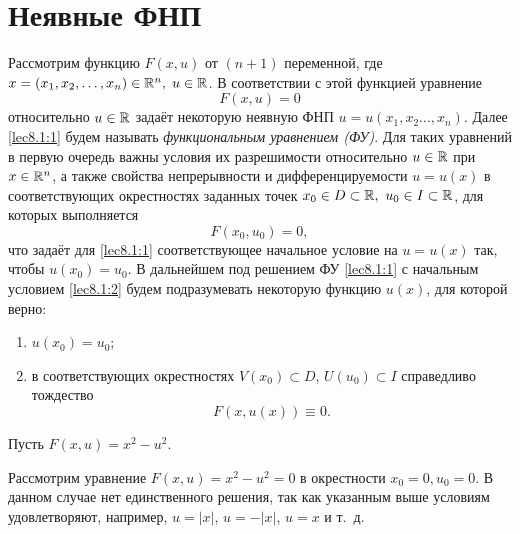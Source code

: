 \documentclass[../../main.tex]{subfiles}
\begin{document}
	\section{Неявные ФНП}

	Рассмотрим функцию $F(x, u)$ от $(n+1)$ переменной, где $x = (x_1, x_2, 
	\ldots,  x_n) \in \mathbb{R}^n, \; u \in \mathbb{R}$. В соответствии с этой функцией уравнение
	 \begin{equation}
		F(x,u) = 0 \label{lec8.1:1}
	 \end{equation}
	 относительно $u \in \mathbb{R}$ задаёт некоторую неявную ФНП $u = u(x_1, x_2 
	 \ldots, x_n)$. Далее \eqref{lec8.1:1} будем называть \emph{функциональным 
	 уравнением (ФУ)}. Для таких уравнений в первую очередь важны условия их 
	 разрешимости относительно $u \in \mathbb{R}$ при $x \in \mathbb{R}^n$, а также свойства 
	 непрерывности и дифференцируемости $u = u(x)$ в соответствующих 
	 окрестностях заданных точек $x_0 \in D \subset \mathbb{R},\ u_0 \in I  \subset \mathbb{R}$, 
	 для которых выполняется
	 \begin{equation}
		F(x_0, u_0) = 0, \label{lec8.1:2}
	 \end{equation}
	 что задаёт для \eqref{lec8.1:1} соответствующее начальное условие на $u = 
	 u(x)$ так, чтобы $u(x_0) = u_0$. В дальнейшем под решением ФУ 
	 \eqref{lec8.1:1} с начальным условием \eqref{lec8.1:2} будем подразумевать 
	 некоторую функцию $u(x)$, для которой верно: 
	 \begin{enumerate}
	 	\item $u(x_0) = u_0$;
	 	\item в соответствующих окрестностях $V(x_0) \subset D$, $U(u_0) 
	 	\subset I$ справедливо тождество
		\begin{equation}
			F(x, u(x)) \equiv 0. \label{lec8.1:3}
		\end{equation}
	 \end{enumerate}
	 \begin{exmp}
		Пусть $F(x, u) = x^2 - u^2$.

		Рассмотрим уравнение $F(x, u) = x^2 - u^2 = 0$ в окрестности $x_0=0, 
		u_0=0$. В данном случае нет единственного решения, так как указанным 
		выше условиям удовлетворяют, например, $u=|x|$, $u=-|x|$, $u = x$  и т.~д.
	 \end{exmp}
\end{document}
